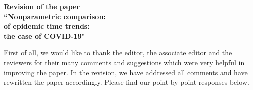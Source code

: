 \documentclass[a4paper,12pt]{article}
\begin{document}
\begin{center} 
{\large \bf Revision of the paper} \\[0.1cm]
{\large \bf ``Nonparametric comparison:} \\[0.1cm]
{\large \bf of epidemic time trends:} \\[0.1cm]
{\large \bf the case of COVID-19"} 
\end{center}
\vspace{7pt}



First of all, we would like to thank the editor, the associate editor and the reviewers for their many comments and suggestions which were very helpful in improving the paper. In the revision, we have addressed all comments and have rewritten the paper accordingly. Please find our point-by-point responses below. %

\vspace{10pt}
\end{document}
